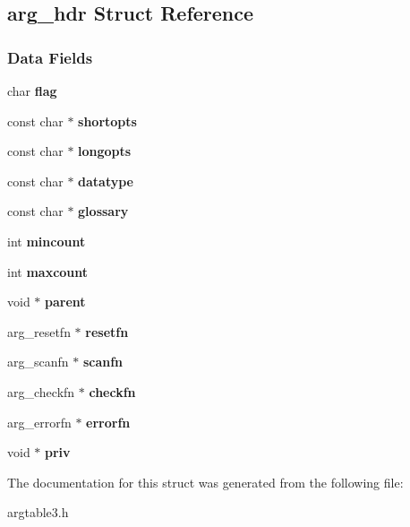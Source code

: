 \hypertarget{structarg__hdr}{}\subsection{arg\+\_\+hdr Struct Reference}
\label{structarg__hdr}
\subsubsection*{Data Fields}
\begin{DoxyCompactItemize}
\item 
\mbox{\label{structarg__hdr_a9f3cb843aac57cfad9c1fe4de5cb14bd}} 
char {\bfseries flag}
\item 
\mbox{\label{structarg__hdr_a48c0d7fb876e6f6e57850f282373ec0e}} 
const char $\ast$ {\bfseries shortopts}
\item 
\mbox{\label{structarg__hdr_a10c111dc87cba922999fb3df9e0fddb9}} 
const char $\ast$ {\bfseries longopts}
\item 
\mbox{\label{structarg__hdr_ab2ce9d2572f8da0d48be98d6c2cbddf3}} 
const char $\ast$ {\bfseries datatype}
\item 
\mbox{\label{structarg__hdr_a1d4fe07468a704f059f38e8e144dc5ac}} 
const char $\ast$ {\bfseries glossary}
\item 
\mbox{\label{structarg__hdr_a6dd2a2f1a4394a68abf64b11d80c5c64}} 
int {\bfseries mincount}
\item 
\mbox{\label{structarg__hdr_a7eb5f9be879e4214cd3fe42bac8ce99f}} 
int {\bfseries maxcount}
\item 
\mbox{\label{structarg__hdr_a4720cbc498bd74a55612edc054f8d670}} 
void $\ast$ {\bfseries parent}
\item 
\mbox{\label{structarg__hdr_a6ed05b7c388dea710b41c8da72bfe987}} 
arg\+\_\+resetfn $\ast$ {\bfseries resetfn}
\item 
\mbox{\label{structarg__hdr_a263be45e6d91e91fea4fc539df9a54fd}} 
arg\+\_\+scanfn $\ast$ {\bfseries scanfn}
\item 
\mbox{\label{structarg__hdr_ae7435d6a03fb8a32fd6fa64fbd707845}} 
arg\+\_\+checkfn $\ast$ {\bfseries checkfn}
\item 
\mbox{\label{structarg__hdr_a38d5e3d139e6cdb04474aede48439a2f}} 
arg\+\_\+errorfn $\ast$ {\bfseries errorfn}
\item 
\mbox{\label{structarg__hdr_ac4be91967af1c23425c4a70383d5f2d6}} 
void $\ast$ {\bfseries priv}
\end{DoxyCompactItemize}


The documentation for this struct was generated from the following file\+:\begin{DoxyCompactItemize}
\item 
argtable3.\+h\end{DoxyCompactItemize}
